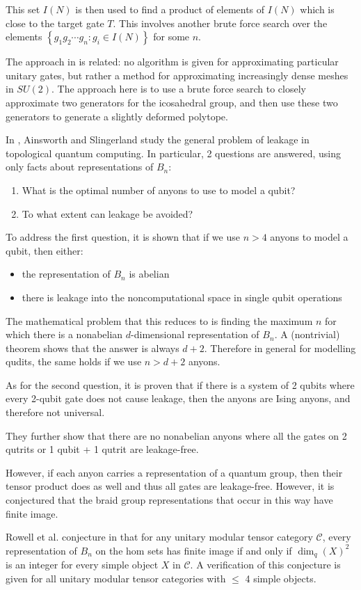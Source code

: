 This set $I(N)$ is then used to find a product of elements of $I(N)$ which
is close to the target gate $T$. This involves another brute force search over
the elements $\left\{ g_1g_2\cdots g_n: g_i \in I(N) \right\}$ for some $n$. 

The approach in \cite{Mosseri2008} is related: no algorithm is given
for approximating particular unitary gates, but rather a method for
approximating increasingly dense meshes in $SU(2)$. The approach here is to
use a brute force search to closely approximate two generators for the
icosahedral group, and then use these two generators to generate a slightly
deformed polytope.

In \cite{Ainsworth2011}, Ainsworth and Slingerland study the general problem of
leakage in topological quantum computing.  In particular, 2 questions are
answered, using only facts about representations of $B_n$:

\begin{enumerate}
\item What is the optimal number of anyons to use to model a qubit?
\item To what extent can leakage be avoided?
\end{enumerate}

To address the first question, it is shown that if we use $n > 4$ anyons to
model a qubit, then either:

\begin{itemize}
\item the representation of $B_n$ is abelian
\item there is leakage into the noncomputational space in single qubit operations
\end{itemize}

The mathematical problem that this reduces to is finding the maximum $n$ for
which there is a nonabelian $d$-dimensional representation of $B_n$. A
(nontrivial) theorem shows that the answer is always $d+2$.
Therefore in general for modelling qudits, the same holds if we use $n > d+2$ anyons.

As for the second question, it is proven that if there is a system of 2 qubits
where every 2-qubit gate does not cause leakage, then the anyons are Ising
anyons, and therefore not universal.

They further show that there are no nonabelian anyons where all the gates on 2
qutrits or 1 qubit + 1 qutrit are leakage-free.

However, if each anyon carries a representation of a quantum group, then their
tensor product does as well and thus all gates are leakage-free. However, it is
conjectured that the braid group representations that occur in this way have
finite image.

Rowell et al. conjecture in \cite{Rowell2007} that for any unitary modular
tensor category $\mathcal{C}$, every representation of $B_n$ on the hom sets
has finite image if and only if $\dim_q(X)^2$ is an integer for every simple
object $X$ in $\mathcal{C}$. A verification of this conjecture is given for all
unitary modular tensor categories with $\leq$ 4 simple objects.
